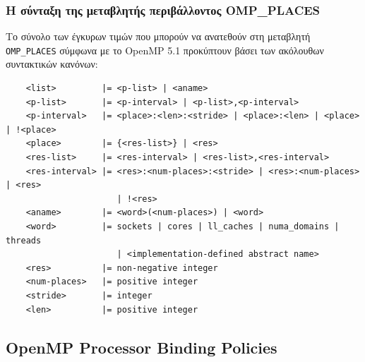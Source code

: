 \subsubsection{Η σύνταξη της μεταβλητής περιβάλλοντος OMP\_PLACES}
\label{ssec:OMP Places syntax}
Το σύνολο των έγκυρων τιμών που μπορούν να ανατεθούν στη μεταβλητή \texttt{OMP\_PLACES} σύμφωνα με το OpenMP 5.1 \cite{openmp51} προκύπτουν βάσει των ακόλουθων συντακτικών κανόνων:
\begin{verbatim}
	<list>         |= <p-list> | <aname>
	<p-list>       |= <p-interval> | <p-list>,<p-interval>
	<p-interval>   |= <place>:<len>:<stride> | <place>:<len> | <place> | !<place>
	<place>        |= {<res-list>} | <res>
	<res-list>     |= <res-interval> | <res-list>,<res-interval>
	<res-interval> |= <res>:<num-places>:<stride> | <res>:<num-places> | <res>
	                  | !<res>
	<aname>        |= <word>(<num-places>) | <word>
	<word>         |= sockets | cores | ll_caches | numa_domains | threads
	                  | <implementation-defined abstract name>
	<res>          |= non-negative integer
	<num-places>   |= positive integer
	<stride>       |= integer
	<len>          |= positive integer
\end{verbatim}


\subsection{OpenMP Processor Binding Policies}
\label{ssec:Processor binding policies}


